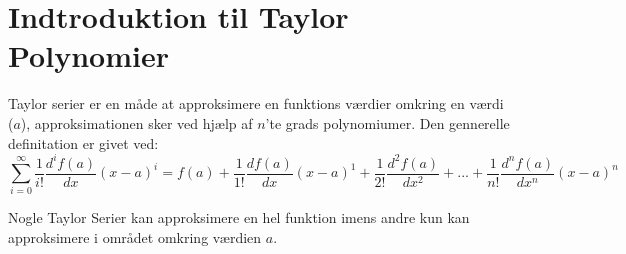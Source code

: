 \section{Indtroduktion til Taylor Polynomier}
Taylor serier er en måde at approksimere en funktions værdier omkring en værdi ($a$), approksimationen sker ved hjælp af $n$'te grads polynomiumer. Den gennerelle definitation er givet ved:
\[
\sum^{\infty}_{i=0} \frac{1}{i!} \frac{d^i f(a)}{dx} (x-a)^{i} = f(a) + \frac{1}{1!} \frac{df(a)}{dx} (x-a)^{1} + \frac{1}{2!} \frac{d^{2}f(a)}{dx^{2}} + ... + \frac{1}{n!} \frac{d^{n} f(a)}{dx^{n}} (x-a)^{n}
\]

Nogle Taylor Serier kan approksimere en hel funktion imens andre kun kan approksimere i området omkring værdien $a$.